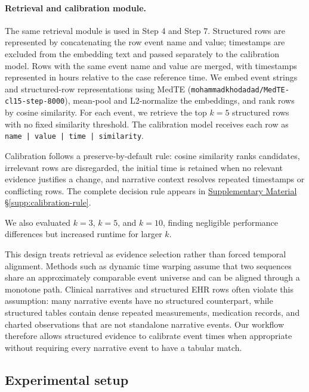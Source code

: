 \documentclass{ws-procs11x85}
\newif\ifshowrebuttalcolor
\newcommand{\rebuttal}[1]{%
  \ifshowrebuttalcolor
    \textcolor{rebuttalblue}{#1}%
  \else
    #1%
  \fi
}
\begin{document}
\vspace{-10pt}
\paragraph{Retrieval and calibration module.}
The same retrieval module is used in Step 4 and Step 7. Structured rows are represented by concatenating the row event name and value; timestamps are excluded from the embedding text and passed separately to the calibration model. Rows with the same event name and value are merged, with timestamps represented in hours relative to the case reference time. We embed event strings and structured-row representations using MedTE (\texttt{mohammadkhodadad/MedTE-cl15-step-8000}), mean-pool and L2-normalize the embeddings, and rank rows by cosine similarity. For each event, we retrieve the top $k=5$ structured rows with no fixed similarity threshold. The calibration model receives each row as \texttt{name | value | time | similarity}. \rebuttal{Calibration follows a preserve-by-default rule: cosine similarity ranks candidates, irrelevant rows are disregarded, the initial time is retained when no relevant evidence justifies a change, and narrative context resolves repeated timestamps or conflicting rows. The complete decision rule appears in \hyperref[supp:calibration-rule]{Supplementary Material \S\ref*{supp:calibration-rule}}.}
We also evaluated $k=3$, $k=5$, and $k=10$, finding negligible performance differences but increased runtime for larger $k$.

This design treats retrieval as evidence selection rather than forced temporal alignment. Methods such as dynamic time warping assume that two sequences share an approximately comparable event universe and can be aligned through a monotone path. Clinical narratives and structured EHR rows often violate this assumption: many narrative events have no structured counterpart, while structured tables contain dense repeated measurements, medication records, and charted observations that are not standalone narrative events. Our workflow therefore allows structured evidence to calibrate event times when appropriate without requiring every narrative event to have a tabular match.

\vspace{-0.75em}
\subsection{Experimental setup}
\label{sec:experimental_setup}
\vspace{-0.25em}
\end{document}

